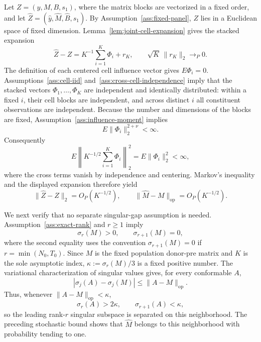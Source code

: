Let \(Z=(y,M,B,s_1)\), where the matrix blocks are vectorized in a fixed order, and let \(\widehat Z=(\widehat y,\widehat M,\widehat B,\widehat s_1)\). By Assumption~\ref{ass:fixed-panel}, \(Z\) lies in a Euclidean space of fixed dimension. Lemma~\ref{lem:joint-cell-expansion} gives the stacked expansion
\[
 \widehat Z-Z=K^{-1}\sum_{i=1}^K\Phi_i+r_K,
 \qquad \sqrt K\,\|r_K\|_2\to_P0.
\]
The definition of each centered cell influence vector gives \(E\Phi_i=0\). Assumptions~\ref{ass:cell-iid} and~\ref{ass:cross-cell-independence} imply that the stacked vectors \(\Phi_1,\ldots,\Phi_K\) are independent and identically distributed: within a fixed \(i\), their cell blocks are independent, and across distinct \(i\) all constituent observations are independent. Because the number and dimensions of the blocks are fixed, Assumption~\ref{ass:influence-moment} implies
\[
 E\|\Phi_i\|_2^{2+\nu}<\infty.
\]
Consequently
\[
 E\left\|K^{-1/2}\sum_{i=1}^K\Phi_i\right\|_2^2
 =E\|\Phi_i\|_2^2<\infty,
\]
where the cross terms vanish by independence and centering. Markov's inequality and the displayed expansion therefore yield
\[
 \|\widehat Z-Z\|_2=O_P(K^{-1/2}),
 \qquad
 \|\widehat M-M\|_{\mathrm{op}}=O_P(K^{-1/2}).
\]

We next verify that no separate singular-gap assumption is needed. Assumption~\ref{ass:exact-rank} and \(r\ge1\) imply
\[
 \sigma_r(M)>0,
 \qquad
 \sigma_{r+1}(M)=0,
\]
where the second equality uses the convention \(\sigma_{r+1}(M)=0\) if \(r=\min(N_0,T_0)\). Since \(M\) is the fixed population donor-pre matrix and \(K\) is the sole asymptotic index, \(\kappa:=\sigma_r(M)/3\) is a fixed positive number. The variational characterization of singular values gives, for every conformable \(A\),
\[
 |\sigma_j(A)-\sigma_j(M)|\le \|A-M\|_{\mathrm{op}}.
\]
Thus, whenever \(\|A-M\|_{\mathrm{op}}<\kappa\),
\[
 \sigma_r(A)>2\kappa,
 \qquad
 \sigma_{r+1}(A)<\kappa,
\]
so the leading rank-\(r\) singular subspace is separated on this neighborhood. The preceding stochastic bound shows that \(\widehat M\) belongs to this neighborhood with probability tending to one.

